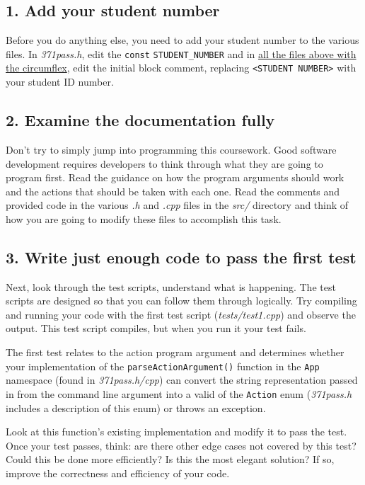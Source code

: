 \documentclass[a4paper]{article}
\begin{document}
\subsection*{1. Add your student number}\label{sec:tasks student-num}
Before you do anything else, you need to add your student number to the various files. In \emph{371pass.h}, edit the \texttt{const} \texttt{STUDENT\_NUMBER} and in \hyperref[sec:cwk dir]{all the files above with the circumflex}, edit the initial block comment, replacing \texttt{<STUDENT NUMBER>} with your student ID number.



\subsection*{2. Examine the documentation fully}\label{sec:tasks documentation}
Don't try to simply jump into programming this coursework. Good software development requires developers to think through what they are going to program first. Read the guidance on how the program arguments should work and the actions that should be taken with each one. Read the comments and provided code in the various \emph{.h} and \emph{.cpp} files in the \emph{src/} directory and think of how you are going to modify these files to accomplish this task.



\subsection*{3. Write just enough code to pass the first test}\label{sec:tasks first-test}
Next, look through the test scripts, understand what is happening. The test scripts are designed so that you can follow them through logically. Try compiling and running your code with the first test script (\emph{tests/test1.cpp}) and observe the output. This test script compiles, but when you run it your test fails.

The first test relates to the action program argument and determines whether your implementation of the \texttt{parseActionArgument()} function in the \texttt{App} namespace (found in \emph{371pass.h/cpp}) can convert the string representation passed in from the command line argument into a valid of the \texttt{Action} enum (\emph{371pass.h} includes a description of this enum) or throws an exception.

Look at this function's existing implementation and modify it to pass the test. Once your test passes, think: are there other edge cases not covered by this test? Could this be done more efficiently? Is this the most elegant solution? If so, improve the correctness and efficiency of your code.
\end{document}
